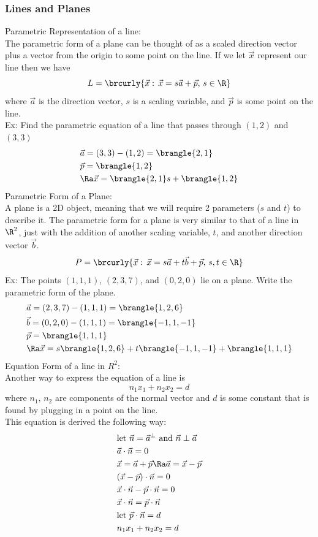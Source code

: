 \subsubsection{Lines and Planes}
Parametric Representation of a line:\\
The parametric form of a plane can be thought of as a scaled direction vector plus a vector from the origin to some point on the line. If we let $\vec{x}$ represent our line then we have
$$L=\brcurly{\vec{x}:\,\vec{x}=s\vec{a}+\vec{p},\,s\in\R}$$
where $\vec{a}$ is the direction vector, $s$ is a scaling variable, and $\vec{p}$ is some point on the line.\\
Ex: Find the parametric equation of a line that passes through $(1,2)$ and $(3,3)$
\begin{align*}
    &\vec{a}=(3,3)-(1,2)=\brangle{2,1}\\
    &\vec{p}=\brangle{1,2}\\
    &\Ra\vec{x}=\brangle{2,1}s+\brangle{1,2}
\end{align*}
Parametric Form of a Plane:\\
A plane is a 2D object, meaning that we will require 2 parameters ($s$ and $t$) to describe it. The parametric form for a plane is very similar to that of a line in $\R^2$, just with the addition of another scaling variable, $t$, and another direction vector $\vec{b}$.
$$P=\brcurly{\vec{x}:\,\vec{x}=s\vec{a}+t\vec{b}+\vec{p},\,s,t\in\R}$$
Ex: The points $(1,1,1)$, $(2,3,7)$, and $(0,2,0)$ lie on a plane. Write the parametric form of the plane.
\begin{align*}
    &\vec{a}=(2,3,7)-(1,1,1)=\brangle{1,2,6}\\
    &\vec{b}=(0,2,0)-(1,1,1)=\brangle{-1,1,-1}\\
    &\vec{p}=\brangle{1,1,1}\\
    &\Ra\vec{x}=s\brangle{1,2,6}+t\brangle{-1,1,-1}+\brangle{1,1,1}
\end{align*}
Equation Form of a line in $R^2$:\\
Another way to express the equation of a line is
$$n_1x_1+n_2x_2=d$$
where $n_1,\,n_2$ are components of the normal vector and $d$ is some constant that is found by plugging in a point on the line.\\
This equation is derived the following way:
\begin{align*}
    &\text{let }\vec{n}=\vec{a}^\perp\text{ and }\vec{n}\perp\vec{a}\\
    &\vec{a}\cdot\vec{n}=0\\
    &\vec{x}=\vec{a}+\vec{p}\Ra\vec{a}=\vec{x}-\vec{p}\\
    &(\vec{x}-\vec{p})\cdot\vec{n}=0\\
    &\vec{x}\cdot\vec{n}-\vec{p}\cdot\vec{n}=0\\
    &\vec{x}\cdot\vec{n}=\vec{p}\cdot\vec{n}\\
    &\text{let }\vec{p}\cdot\vec{n}=d\\
    &n_1x_1+n_2x_2=d
\end{align*}
